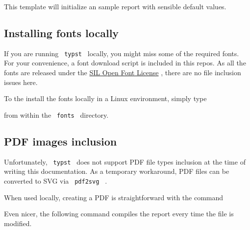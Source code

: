 This template will initialize an sample report with sensible default
values.

\subsection{Installing fonts locally}\label{installing-fonts-locally}

If you are running \texttt{\ typst\ } locally, you might miss some of
the required fonts. For your convenience, a font download script is
included in this repos. As all the fonts are released under the
\href{https://openfontlicense.org/}{SIL Open Font License} , there are
no file inclusion issues here.

To the install the fonts locally in a Linux environment, simply type

\begin{Shaded}
\begin{Highlighting}[]
\end{Highlighting}
\end{Shaded}

from within the \texttt{\ fonts\ } directory.

\subsection{PDF images inclusion}\label{pdf-images-inclusion}

Unfortunately, \texttt{\ typst\ } does not support PDF file types
inclusion at the time of writing this documentation. As a temporary
workaround, PDF files can be converted to SVG via \texttt{\ pdf2svg\ } .

When used locally, creating a PDF is straightforward with the command

\begin{Shaded}
\begin{Highlighting}[]
\end{Highlighting}
\end{Shaded}

Even nicer, the following command compiles the report every time the
file is modified.

\begin{Shaded}
\begin{Highlighting}[]
\end{Highlighting}
\end{Shaded}

